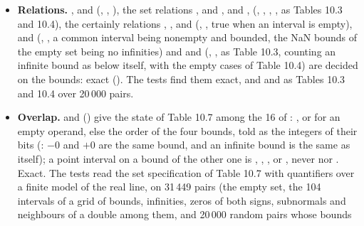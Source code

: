 \documentclass[12pt,a4paper,twoside,openright]{book}
\begin{document}
\begin{itemize}
   (, ) give the greater of
  $m-l$ and $u-m$ rounded upward, $m$ being , $+\infty$
  for the unbounded intervals and NaN for the empty set: as 12.12.8
  requires. ,  and  are taken on the
  bounds: exact.  is the distance rounded upward:
  tightest.
\item[$\bullet$] \textbf{Relations.} ,
   and  (,
  , ), the set relations ,
   and , 
  and ,  (, ,
  , , as Tables 10.3 and 10.4), the certainly
  relations , ,
   and  (,
  , true when an interval is empty),
   and  (,
  , a common interval being nonempty and bounded,
  the NaN bounds of the empty set being no infinities\newinvfive) and
   and  (,
  , as Table 10.3,  counting an infinite
  bound as below itself, with the empty cases of Table 10.4\newinvfive) are
  decided on the bounds: exact (). The tests
  find them exact, and  and  as Tables 10.3
  and 10.4 over 20\,000 pairs.
\item[$\bullet$] \textbf{Overlap.}  and
   () give the state of
  Table 10.7 among the 16 of :
  ,  or  for an
  empty operand, else the order of the four bounds, told as the integers of
  their bits (: $-0$ and $+0$ are the same
  bound, and an infinite bound is the same as itself); a point interval on
  a bound of the other one is , ,
  ,  or , never
   nor .\newinvfive{} Exact. The tests read
  the set specification of Table 10.7 with quantifiers over a finite model
  of the real line, on 31\,449 pairs (the empty set, the 104 intervals of
  a grid of bounds, infinities, zeros of both signs, subnormals and
  neighbours of a double among them, and 20\,000 random pairs whose bounds

\end{itemize}
\end{document}
